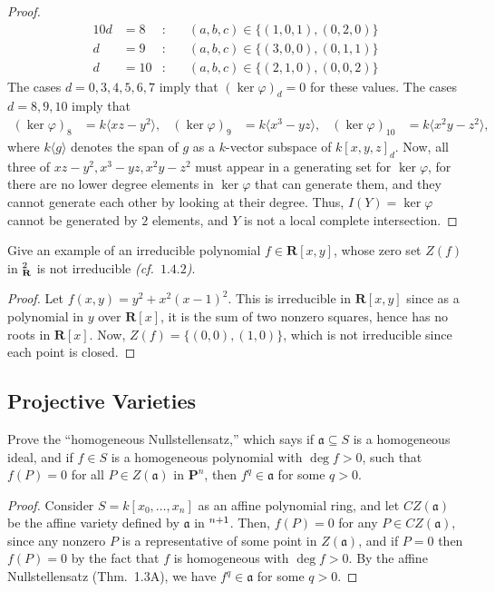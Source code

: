 \documentclass[10pt]{article}
\theoremstyle{definition}
\theoremstyle{remark}
\numberwithin{equation}{section}
\numberwithin{figure}{subsubsection}
\let\AA\relax
\DeclareMathOperator{\AA}{\mathbf{A}}
\newcommand{\PP}{\mathbf{P}}
\begin{document}
\begin{proof}
{\begin{alignat*}{10}
    d &= 8&:& \quad (a,b,c) \in \{(1,0,1),(0,2,0)\}\\
    d &= 9&:& \quad (a,b,c) \in \{(3,0,0),(0,1,1)\}\\
    d &= 10&:& \quad (a,b,c) \in \{(2,1,0),(0,0,2)\}
  \end{alignat*}}
  The cases $d=0,3,4,5,6,7$ imply that $(\ker \varphi)_d = 0$ for these values.
  The cases $d=8,9,10$ imply that
  \begin{align*}
    (\ker\varphi)_8 &= k\langle xz-y^2 \rangle, & (\ker\varphi)_9 &= k\langle
    x^3-yz \rangle, & (\ker\varphi)_{10} &= k\langle x^2y-z^2 \rangle,
  \end{align*}
  where $k\langle g \rangle$ denotes the span of $g$ as a $k$-vector subspace of
  $k[x,y,z]_d$.
  Now, all three of $xz-y^2,x^3-yz,x^2y - z^2$ must appear in a generating set for
  $\ker\varphi$, for there are no lower degree elements in $\ker\varphi$ that
  can generate them, and they cannot generate each other by looking at their
  degree.
  Thus, $I(Y) = \ker\varphi$ cannot be generated by $2$ elements, and $Y$ is not
  a local complete intersection.
\end{proof}

\begin{problem}
  Give an example of an irreducible polynomial $f \in \mathbf{R}[x,y]$,
  whose zero set $Z(f)$ in $\AA_{\mathbf{R}}^2$ is not irreducible
  \emph{(cf.~$1.4.2$)}.
\end{problem}
\begin{proof}
  Let $f(x,y) = y^2 + x^2(x-1)^2$. This is irreducible in $\mathbf{R}[x,y]$
  since as a polynomial in $y$ over $\mathbf{R}[x]$, it is the sum of two
  nonzero squares, hence has no roots in $\mathbf{R}[x]$. Now, $Z(f) =
  \{(0,0),(1,0)\}$, which is not irreducible since each point is closed.
\end{proof}

\subsection{Projective Varieties}
\begin{problem}\label{exc:I.2.1}
  Prove the ``homogeneous Nullstellensatz,'' which says if $\mathfrak{a}
  \subseteq S$ is a homogeneous ideal, and if $f \in S$ is a homogeneous
  polynomial with $\deg f > 0$, such that $f(P) = 0$ for all $P \in
  Z(\mathfrak{a})$ in $\PP^n$, then $f^q \in \mathfrak{a}$ for some $q >
  0$.
\end{problem}
\begin{proof}
  Consider $S = k[x_0,\ldots,x_n]$ as an affine polynomial ring, and let
  $CZ(\mathfrak{a})$ be the affine variety defined by $\mathfrak{a}$ in
  $\AA^{n+1}$.
  Then, $f(P) = 0$ for any $P \in CZ(\mathfrak{a})$, since any nonzero $P$ is a
  representative of some point in $Z(\mathfrak{a})$, and if $P=0$ then $f(P) =
  0$ by the fact that $f$ is homogeneous with $\deg f > 0$.
  By the affine Nullstellensatz (Thm.~1.3A), we have $f^q \in \mathfrak{a}$ for
  some $q > 0$.
\end{proof}
\end{document}

